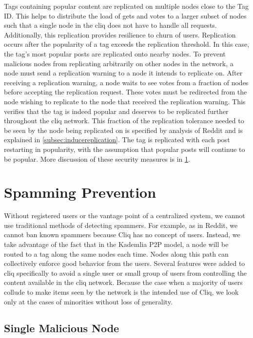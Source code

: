 \documentclass{sig-alternate}
\begin{document}
Tags containing popular content are replicated on multiple nodes close to the Tag ID. 
This helps to distribute the load of gets and votes to a larger subset of nodes such that a single node in the cliq does not have to handle all requests. 
Additionally, this replication provides resilience to churn of users. 
Replication occurs after the popularity of a tag exceeds the replication threshold. In this case, the tag's most popular posts are replicated onto nearby nodes. 
To prevent malicious nodes from replicating arbitrarily on other nodes in the network, a node must send a replication warning to a node it intends to replicate on. 
After receiving a replication warning, a node waits to see votes from a fraction of nodes before accepting the replication request. 
These votes must be redirected from the node wishing to replicate to the node that received the replication warning. 
This verifies that the tag is indeed popular and deserves to be replicated further throughout the cliq network. 
This fraction of the replication tolerance needed to be seen by the node being replicated on is specified by analysis of Reddit and is explained in \ref{subsec:inducereplication}. 
The tag is replicated with each post restarting in popularity, with the assumption that popular posts will continue to be popular. 
More discussion of these security measures is in \ref{sec:spam}. 

\section{Spamming Prevention}
\label{sec:spam}
Without registered users or the vantage point of a centralized system, we cannot use traditional methods of detecting spammers. For example, as in Reddit, we cannot ban known spammers because Cliq has no concept of users.  Instead, we take advantage of the fact that in the Kademlia P2P model, a node will be routed to a tag along the same nodes each time. Nodes along this path can collectively enforce good behavior from the users. Several features were added to cliq specifically to avoid a single user or small group of users from controlling the content available in the cliq network. Because the case when a majority of users collude to make items seen by the network is the intended use of Cliq, we look only at the cases of minorities without loss of generality. \cite{kademlia}

\subsection{Single Malicious Node}
\label{subsec:spamsingle}
\end{document}
